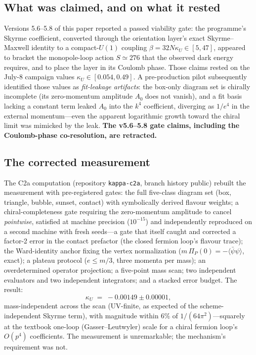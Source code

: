 \documentclass[11pt]{article}
\begin{document}
\subsection{What was claimed, and on what it rested}

Versions 5.6--5.8 of this paper reported a passed viability gate: the
programme's Skyrme coefficient, converted through the orientation
layer's exact Skyrme--Maxwell identity to a compact-$U(1)$ coupling
$\beta = 32N\kappa_U \in [5,47]$, appeared to bracket the
monopole-loop action $S \simeq 276$ that the observed dark energy
requires, and to place the layer in its Coulomb phase.  Those claims
rested on the July-8 campaign values $\kappa_U \in [0.054, 0.49]$.
A pre-production pilot subsequently identified those values as
\emph{fit-leakage artifacts}: the box-only diagram set is chirally
incomplete (its zero-momentum amplitude $A_0$ does not vanish), and a
fit basis lacking a constant term leaked $A_0$ into the $k^4$
coefficient, diverging as $1/e^4$ in the external momentum---even the
apparent logarithmic growth toward the chiral limit was mimicked by
the leak.  \textbf{The v5.6--5.8 gate claims, including the
Coulomb-phase co-resolution, are retracted.}

\subsection{The corrected measurement}

The C2a computation (repository \texttt{kappa-c2a}, branch history
public) rebuilt the measurement with pre-registered gates: the full
five-class diagram set (box, triangle, bubble, sunset, contact) with
symbolically derived flavour weights; a chiral-completeness gate
requiring the zero-momentum amplitude to cancel \emph{pointwise},
satisfied at machine precision ($10^{-15}$) and independently
reproduced on a second machine with fresh seeds---a gate that itself
caught and corrected a factor-2 error in the contact prefactor (the
closed fermion loop's flavour trace); the Ward-identity anchor fixing
the vertex normalization ($m\,\Pi_P(0) = -\langle\bar\psi\psi\rangle$,
exact); a plateau protocol ($e \le m/3$, three momenta per mass); an
overdetermined operator projection; a five-point mass scan; two
independent evaluators and two independent integrators; and a stacked
error budget.  The result:
\begin{equation}
\kappa_U \;=\; -0.00149 \pm 0.00001,
\end{equation}
mass-independent across the scan (UV-finite, as expected of the
scheme-independent Skyrme term), with magnitude within $6\%$ of
$1/(64\pi^2)$---squarely at the textbook one-loop
(Gasser--Leutwyler) scale for a chiral fermion loop's $O(p^4)$
coefficients.  The measurement is unremarkable; the mechanism's
requirement was not.
\end{document}
